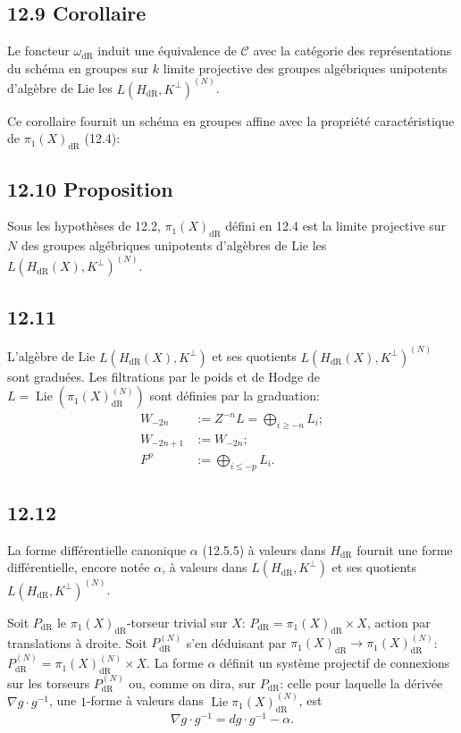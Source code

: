 \documentclass[12pt,a4paper]{article}
\theoremstyle{plain}
\theoremstyle{definition}
\theoremstyle{remark}
\DeclareMathOperator{\Lie}{Lie}
\newcommand{\cC}{\mathcal{C}}
\newcommand{\dr}{\mathrm{dR}}
\begin{document}
\subsection*{12.9 Corollaire}

Le foncteur $\omega_{\dr}$ induit une équivalence de $\cC$ avec la catégorie des représentations du schéma en groupes sur $k$ limite projective des groupes algébriques unipotents d'algèbre de Lie les $L(H_{\dr}, K^\perp)^{(N)}$.

Ce corollaire fournit un schéma en groupes affine avec la propriété caractéristique de $\pi_1(X)_{\dr}$ (12.4):

\subsection*{12.10 Proposition}

Sous les hypothèses de 12.2, $\pi_1(X)_{\dr}$ défini en 12.4 est la limite projective sur $N$ des groupes algébriques unipotents d'algèbres de Lie les $L(H_{\dr}(X), K^\perp)^{(N)}$.

\subsection*{12.11}

L'algèbre de Lie $L(H_{\dr}(X), K^\perp)$ et ses quotients $L(H_{\dr}(X), K^\perp)^{(N)}$ sont graduées. Les filtrations par le poids et de Hodge de $L = \Lie(\pi_1(X)_{\dr}^{(N)})$ sont définies par la graduation:
\begin{align*}
W_{-2n} &:= Z^{-n} L = \textstyle\bigoplus_{i \geqslant -n} L_i;\\
W_{-2n+1} &:= W_{-2n};\\
F^p &:= \textstyle\bigoplus_{i \leqslant -p} L_i.
\end{align*}

\subsection*{12.12}

La forme différentielle canonique $\alpha$ (12.5.5) à valeurs dans $H_{\dr}$ fournit une forme différentielle, encore notée $\alpha$, à valeurs dans $L(H_{\dr}, K^\perp)$ et ses quotients $L(H_{\dr}, K^\perp)^{(N)}$.

Soit $P_{\dr}$ le $\pi_1(X)_{\dr}$-torseur trivial sur $X$: $P_{\dr} = \pi_1(X)_{\dr} \times X$, action par translations à droite. Soit $P_{\dr}^{(N)}$ s'en déduisant par $\pi_1(X)_{\dr} \to \pi_1(X)_{\dr}^{(N)}$: $P_{\dr}^{(N)} = \pi_1(X)_{\dr}^{(N)} \times X$. La forme $\alpha$ définit un système projectif de connexions sur les torseurs $P_{\dr}^{(N)}$ ou, comme on dira, sur $P_{\dr}$: celle pour laquelle la dérivée $\nabla g \cdot g^{-1}$, une $1$-forme à valeurs dans $\Lie \pi_1(X)_{\dr}^{(N)}$, est
\begin{equation}\label{eq:12.12.1}
\nabla g \cdot g^{-1} = dg \cdot g^{-1} - \alpha.
\end{equation}
\end{document}
